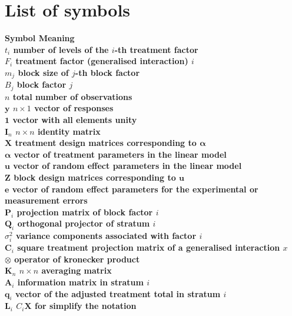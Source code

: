 \chapter*{List of symbols}


\begin{tabbing}
\bf{Symbol}  \=  \bf{Meaning} \\
$t_i$ \> number of levels of the $i$-th treatment factor \\
$F_i$ \> treatment factor (generalised interaction) $i$ \\
$m_j$ \> block size of $j$-th block factor\\
$B_j$ \> block factor $j$ \\
$n$ \> total number of observations \\
$\bm{y}$ \> $n \times 1$ vector of responses \\
$\bm{1}$ \>  vector with all elements unity \\
$\textbf{I}_n$ \> $n \times n$ identity matrix \\
$\textbf{X}$ \> treatment design matrices corresponding to $\bm{\alpha}$\\
$\bm{\alpha}$ \> vector of treatment parameters in the linear model \\
$\bm{u}$ \> vector of random effect parameters in the linear model \\
$\textbf{Z}$ \> block design matrices corresponding to $\bm{u}$\\
$\bm{e}$ \> vector of random effect parameters for the experimental or measurement errors\\
$\textbf{P}_{i}$ \> projection matrix of block factor $i$ \\
$\textbf{Q}_{i}$ \> orthogonal projector of stratum $i$\\
$\sigma_i^2$ \> variance components associated with factor $i$\\
$\textbf{C}_i$ \> square treatment projection matrix of a generalised interaction $x$\\
$\otimes$ \> operator of kronecker product\\
$\textbf{K}_n$ \> $n \times n$ averaging matrix \\
$\textbf{A}_{i}$ \> information matrix in stratum $i$\\
$\bm{q}_{i}$ \>  vector of the adjusted treatment total in stratum $i$\\
$\textbf{L}_i$ \>  $C_i\textbf{X}$ for simplify the notation \\

\end{tabbing}
